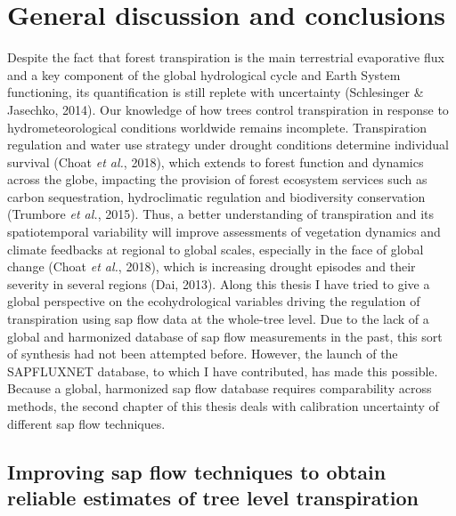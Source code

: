 \documentclass[11pt,twoside]{reedthesis}
\begin{document}
\newpage

\null\newpage

\chapter[General discussion and conclusions]{General discussion and conclusions}

\setlength{\parskip}{0.2cm plus4mm minus3mm}

\newpage

\setlength{\parindent}{0pt} Despite the fact that forest transpiration
is the main terrestrial evaporative flux and a key component of the
global hydrological cycle and Earth System functioning, its
quantification is still replete with uncertainty (Schlesinger \&
Jasechko, 2014). Our knowledge of how trees control transpiration in
response to hydrometeorological conditions worldwide remains incomplete.
Transpiration regulation and water use strategy under drought conditions
determine individual survival (Choat \emph{et al.}, 2018), which extends
to forest function and dynamics across the globe, impacting the
provision of forest ecosystem services such as carbon sequestration,
hydroclimatic regulation and biodiversity conservation (Trumbore
\emph{et al.}, 2015). Thus, a better understanding of transpiration and
its spatiotemporal variability will improve assessments of vegetation
dynamics and climate feedbacks at regional to global scales, especially
in the face of global change (Choat \emph{et al.}, 2018), which is
increasing drought episodes and their severity in several regions (Dai,
2013). Along this thesis I have tried to give a global perspective on
the ecohydrological variables driving the regulation of transpiration
using sap flow data at the whole-tree level. Due to the lack of a global
and harmonized database of sap flow measurements in the past, this sort
of synthesis had not been attempted before. However, the launch of the
SAPFLUXNET database, to which I have contributed, has made this
possible. Because a global, harmonized sap flow database requires
comparability across methods, the second chapter of this thesis deals
with calibration uncertainty of different sap flow techniques. \par

\section{Improving sap flow techniques to obtain reliable estimates of
tree level
transpiration}\label{improving-sap-flow-techniques-to-obtain-reliable-estimates-of-tree-level-transpiration}
\end{document}
